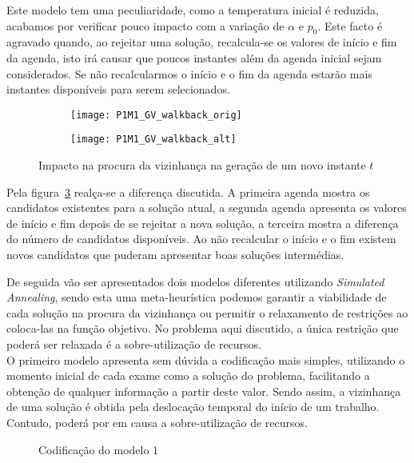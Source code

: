 Este modelo tem uma peculiaridade, como a temperatura inicial é reduzida, acabamos por verificar pouco impacto com a variação de $\alpha$ e $p_{0}$. Este facto é agravado quando, ao rejeitar uma solução, recalcula-se os valores de início e fim da agenda, isto irá causar que poucos instantes além da agenda inicial sejam considerados. Se não recalcularmos o início e o fim da agenda estarão mais instantes disponíveis para serem selecionados.\\
\begin{figure}[H]
	\centering
	\begin{subfigure}{0.49\textwidth}
	\centering
		\texttt{[image: P1M1\_GV\_walkback\_orig]}
		\caption{}
		\label{fig:P1M1_GV_walkback_orig}
	\end{subfigure}
	\begin{subfigure}{0.49\textwidth}
	\centering
		\texttt{[image: P1M1\_GV\_walkback\_alt]}
		\caption{}
		\label{fig:P1M1_GV_walkback_alt}
	\end{subfigure}
	\caption{Impacto na procura da vizinhança na geração de um novo instante $t$}
	\label{fig:P1M1_GV_walkback}
\end{figure}
Pela figura~\ref{fig:P1M1_GV_walkback} realça-se a diferença discutida. A primeira agenda mostra os candidatos existentes para a solução atual, a segunda agenda apresenta os valores de início e fim depois de se rejeitar a nova solução, a terceira mostra a diferença do número de candidatos disponíveis. Ao não recalcular o início e o fim existem novos candidatos que puderam apresentar boas soluções intermédias.






De seguida vão ser apresentados dois modelos diferentes utilizando \textit{Simulated Annealing}, sendo esta uma meta-heurística podemos garantir a viabilidade de cada solução na procura da vizinhança ou permitir o relaxamento de restrições ao coloca-las na função objetivo. No problema aqui discutido, a única restrição que poderá ser relaxada é a sobre-utilização de recursos.\\

O primeiro modelo apresenta sem dúvida a codificação mais simples, utilizando o momento inicial de cada exame como a solução do problema, facilitando a obtenção de qualquer informação a partir deste valor. Sendo assim, a vizinhança de uma solução é obtida pela deslocação temporal do início de um trabalho. Contudo, poderá por em causa a sobre-utilização de recursos.\\
\begin{figure}[h]
	\centering
	\makebox[\textwidth][c]{%
		\texttt{[image: P1M1]}
	}
	\caption{Codificação do modelo $1$}
	\label{fig:cod_prob1_mod1}
\end{figure}

